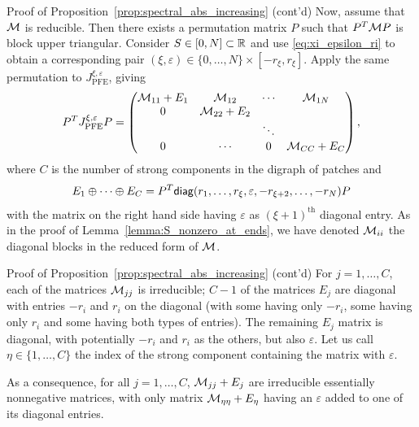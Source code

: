 \documentclass[aspectratio=169]{beamer}
\begin{document}
\begin{frame}{Proof of Proposition~\ref{prop:spectral_abs_increasing} (cont'd)}	
	Now, assume that $\mathcal{M}$ is reducible. Then there exists a permutation matrix $P$ such that $P^T\mathcal{M} P$ is block upper triangular. Consider $S\in[0,N]\subset\mathbb{R}$ and use \eqref{eq:xi_epsilon_ri} to obtain a corresponding pair $(\xi,\varepsilon)\in\{0,\ldots,N\}\times [-r_{\xi},r_{\xi}]$. Apply the same permutation to $J_{\textrm{PFE}}^{\xi,\varepsilon}$, giving
	\[
	P^TJ_{\textrm{PFE}}^{\xi,\varepsilon}P
	=
	\begin{pmatrix}
	\mathcal{M}_{11}+E_1 & \mathcal{M}_{12} & \cdots & \mathcal{M}_{1N} \\
	0 & \mathcal{M}_{22}+E_2 & & \\
	&&\ddots & \\
	0 & \cdots & 0 & \mathcal{M}_{CC}+E_C
	\end{pmatrix},
	\]
	where $C$ is the number of strong components in the digraph of patches and
	\[
	E_1\oplus\cdots\oplus E_C = P^T\mathsf{diag}(r_1,\ldots,r_{\xi},\varepsilon,-r_{\xi+2},\ldots,-r_N)P
	\]
	with the matrix on the right hand side having $\varepsilon$ as $(\xi+1)^{\textrm{th}}$ diagonal entry.
	As in the proof of Lemma~\ref{lemma:S_nonzero_at_ends}, we have denoted $\mathcal{M}_{ii}$ the diagonal blocks in the reduced form of $\mathcal{M}$.
\end{frame}

\begin{frame}{Proof of Proposition~\ref{prop:spectral_abs_increasing} (cont'd)}	
	For $j=1,\ldots,C$, each of the matrices $\mathcal{M}_{jj}$ is irreducible; $C-1$ of the matrices $E_j$ are diagonal with entries $-r_i$ and $r_i$ on the diagonal (with some having only $-r_i$, some having only $r_i$ and some having both types of entries). The remaining $E_j$ matrix is diagonal, with potentially $-r_i$ and $r_i$ as the others, but also $\varepsilon$. Let us call $\eta\in\{1,\ldots,C\}$ the index of the strong component containing the matrix with $\varepsilon$.
	
	As a consequence, for all $j=1,\ldots,C$, $\mathcal{M}_{jj}+E_j$ are irreducible essentially nonnegative matrices, with only matrix $\mathcal{M}_{\eta\eta}+E_\eta$ having an $\varepsilon$ added to one of its diagonal entries.
\end{frame}
\end{document}

